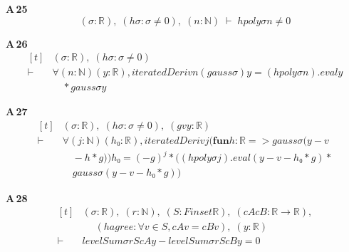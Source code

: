 \noindent\textbf{A\,25}\quad{}
{\footnotesize\[ (\sigma : \mathbb{R} ),\; (\mathit{hσ} : \sigma \neq 0),\; (\mathit{n} : \mathbb{N} ) \;\vdash\; \mathit{hpoly} \sigma \mathit{n} \neq 0 \]}

\noindent\textbf{A\,26}\quad{}
{\footnotesize\[ \begin{aligned}[t]
&(\sigma : \mathbb{R} ),\; (\mathit{hσ} : \sigma \neq 0)\\
\vdash\;&\forall (\mathit{n} : \mathbb{N} ) (\mathit{y} : \mathbb{R} ), \mathit{iteratedDeriv} \mathit{n} (\mathit{gauss} \sigma ) \mathit{y} = (\mathit{hpoly} \sigma \mathit{n}).\mathit{eval} \mathit{y}\\
&\quad * \mathit{gauss} \sigma \mathit{y}
\end{aligned} \]}

\noindent\textbf{A\,27}\quad{}
{\footnotesize\[ \begin{aligned}[t]
&(\sigma : \mathbb{R} ),\; (\mathit{hσ} : \sigma \neq 0),\; (\mathit{g} \mathit{v} \mathit{y} : \mathbb{R} )\\
\vdash\;&\forall (\mathit{j} : \mathbb{N} ) (\mathit{h₀} : \mathbb{R} ), \mathit{iteratedDeriv} \mathit{j} (\mathbf{fun} \mathit{h} : \mathbb{R} => \mathit{gauss} \sigma (\mathit{y} - \mathit{v}\\
&\quad - \mathit{h} * \mathit{g})) \mathit{h₀} = (-\mathit{g}) ^{\mathit{j}} * ((\mathit{hpoly} \sigma \mathit{j}).\mathit{eval} (\mathit{y} - \mathit{v} - \mathit{h₀} * \mathit{g}) *\\
&\quad \mathit{gauss} \sigma (\mathit{y} - \mathit{v} - \mathit{h₀} * \mathit{g}))
\end{aligned} \]}

\noindent\textbf{A\,28}\quad{}
{\footnotesize\[ \begin{aligned}[t]
&(\sigma : \mathbb{R} ),\; (\mathit{r} : \mathbb{N} ),\; (\mathit{S} : \mathit{Finset} \mathbb{R} ),\; (\mathit{cA} \mathit{cB} : \mathbb{R} \to \mathbb{R} ),\\
&\quad \; (\mathit{hagree} : \forall \mathit{v} \in \mathit{S}, \mathit{cA} \mathit{v} = \mathit{cB} \mathit{v}),\; (\mathit{y} : \mathbb{R} )\\
\vdash\;&\mathit{levelSum} \sigma \mathit{r} \mathit{S} \mathit{cA} \mathit{y} - \mathit{levelSum} \sigma \mathit{r} \mathit{S} \mathit{cB} \mathit{y} = 0
\end{aligned} \]}

